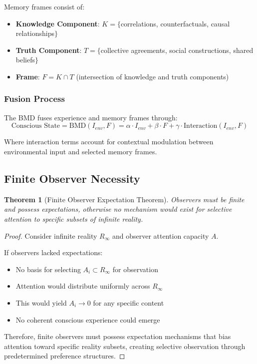 \documentclass[12pt,a4paper]{article}
\newtheorem{theorem}{Theorem}[section]
\begin{document}
Memory frames consist of:
\begin{itemize}
\item \textbf{Knowledge Component}: $K = \{$correlations, counterfactuals, causal relationships$\}$
\item \textbf{Truth Component}: $T = \{$collective agreements, social constructions, shared beliefs$\}$
\item \textbf{Frame}: $F = K \cap T$ (intersection of knowledge and truth components)
\end{itemize}

\subsubsection{Fusion Process}
The BMD fuses experience and memory frames through:
\begin{equation}
\text{Conscious State} = \text{BMD}(I_{env}, F) = \alpha \cdot I_{env} + \beta \cdot F + \gamma \cdot \text{Interaction}(I_{env}, F)
\end{equation}

Where interaction terms account for contextual modulation between environmental input and selected memory frames.

\subsection{Finite Observer Necessity}

\begin{theorem}[Finite Observer Expectation Theorem]
Observers must be finite and possess expectations, otherwise no mechanism would exist for selective attention to specific subsets of infinite reality.
\end{theorem}

\begin{proof}
Consider infinite reality $R_\infty$ and observer attention capacity $A$.

If observers lacked expectations:
\begin{itemize}
\item No basis for selecting $A_i \subset R_\infty$ for observation
\item Attention would distribute uniformly across $R_\infty$
\item This would yield $A_i \rightarrow 0$ for any specific content
\item No coherent conscious experience could emerge
\end{itemize}

Therefore, finite observers must possess expectation mechanisms that bias attention toward specific reality subsets, creating selective observation through predetermined preference structures.
\end{proof}
\end{document}

